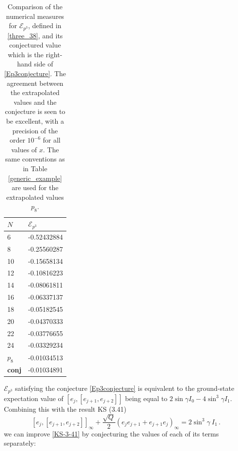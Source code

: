 \documentclass[a4paper,10pt]{article}
\newcommand{\jesper}[1]{$\framebox{\tiny J}$\ \textbf{\texttt{{\color{cyan}\footnotesize#1}}}}
\begin{document}
\begin{table}[h]
\begin{minipage}{0.25\linewidth}
\begin{tabular}{ll}
$N$ & $\mathcal{E}_{p^3}$ \\
\hline
6 & -0.52432884 \\
8 & -0.25560287 \\
10 & -0.15658134 \\
12 & -0.10816223 \\
14 & -0.08061811 \\
16 & -0.06337137 \\
18 & -0.05182545 \\
20 & -0.04370333 \\
22 & -0.03776655 \\
24 & -0.03329234 \\
$p_8$ & -0.01034513\\
\bf{conj} & -0.01034891\\
\hline
\end{tabular}
\end{minipage}%


\caption{Comparison of the numerical measures for $\mathcal{E}_{p^3}$, defined in \eqref{three_38}, and its conjectured value which is the right-hand side of \eqref{Ep3conjecture}. The agreement between the extrapolated values and the conjecture is seen to be excellent, with a precision of the order $10^{-6}$ for all values of $x$. 
The same conventions as in Table \ref{generic_example} are used for the extrapolated values $p_8$.
}\label{difference_c}
\end{table}
%

$\mathcal{E}_{p^3}$ satisfying the conjecture \eqref{Ep3conjecture} is equivalent to the ground-state expectation value of $ [e_j,[e_{j+1},e_{j+2}]] $ being equal to $2\sin\gamma I_0-4\sin^3\gamma I_1$. Combining this with the result KS (3.41)
%
\begin{equation} \label{KS-3-41}
[e_j,[e_{j+1},e_{j+2}]]_\infty+\frac{\sqrt{Q}}{2}(e_je_{j+1}+e_{j+1}e_j)_\infty=2\sin^3 \! \gamma \: I_1 \,.
\end{equation}
%
we can improve \eqref{KS-3-41} by conjecturing the values of each of its terms separately:
\end{document}
